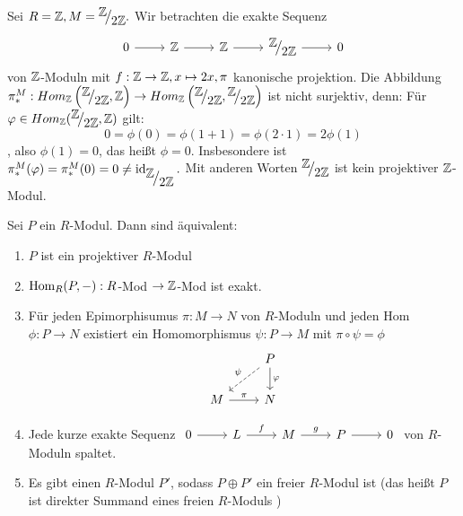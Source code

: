 \begin{bsp}
	Sei $ R = \Z  ,M = \QR{\Z}{2\Z}. $ Wir betrachten die exakte Sequenz  \\ $$\begin{tikzcd}
	0  \arrow{r} & \Z \arrow{r} & \Z \arrow{r} & \QR{\Z}{2\Z} \arrow{r} & 0
	\end{tikzcd}$$ von $\mathbb{Z}$-Moduln  mit $f: \mathbb{Z} \to \mathbb{Z}, x \mapsto 2x, \pi $ kanonische projektion. Die Abbildung $ \pi_{*}^{M}: Hom_{\Z}\left(\QR{\Z}{2\Z}, \Z\right) \to Hom_{\Z}\left(\QR{\Z}{2\Z},\QR{\Z}{2\Z}\right) $ ist nicht surjektiv, denn:  Für $ \phi \in Hom_{\Z}(\QR{\Z}{2\Z}, \Z) $ gilt: 
	$$0 = \phi(0) = \phi( 1 +1) = \phi(2\cdot 1) = 2\phi(1)$$, also $ \phi(1)= 0$, das heißt $\phi = 0$. Insbesondere ist $\pi_{*}^{M}(\phi) = \pi_{*}^{M}(0) =0 \neq \id_{\QR{\Z}{2\Z}} . $ Mit anderen Worten $\QR{\Z}{2\Z}$ ist kein projektiver $\mathbb{Z}$-Modul. 
\end{bsp}
\begin{sa}\label{6.3}
	Sei $P$ ein $R$-Modul. Dann sind äquivalent:
	\begin{enumerate} [label= \roman*)]
		\item $P$ ist ein projektiver $R$-Modul 
		\item $\operatorname{Hom}_R(P,-): R$-Mod $\to \mathbb{Z}$-Mod ist exakt.
		\item Für jeden Epimorphisumus $ \pi: M \to N $ von $R$-Moduln und jeden Hom $ \phi: P \to N $ existiert ein Homomorphismus $\psi: P \to M $ mit $ \pi \circ \psi = \phi$
		$$\begin{tikzcd}
		& P \arrow[swap, dashed]{dl}{\psi} \arrow{d}{\phi} \\
		M \arrow{r}{\pi} & N
		\end{tikzcd}$$
		\item Jede kurze exakte Sequenz $\begin{tikzcd}
		0  \arrow{r} & L \arrow{r}{f} & M \arrow{r}{g} & P \arrow{r} & 0
		\end{tikzcd} $ von $R$-Moduln spaltet.
		\item Es gibt einen $R$-Modul $P'$, sodass $ P \oplus P' $ ein freier $R$-Modul ist (das heißt $P$ ist direkter Summand eines freien $R$-Moduls )
	\end{enumerate}
\end{sa}
